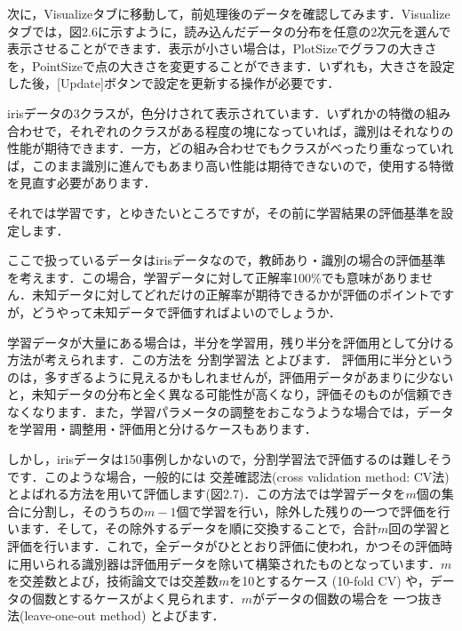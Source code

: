 次に，Visualizeタブに移動して，前処理後のデータを確認してみます．Visualizeタブでは，図2.6に示すように，読み込んだデータの分布を任意の2次元を選んで表示させることができます．表示が小さい場合は，PlotSizeでグラフの大きさを，PointSizeで点の大きさを変更することができます．いずれも，大きさを設定した後，[Update]ボタンで設定を更新する操作が必要です．


irisデータの3クラスが，色分けされて表示されています．いずれかの特徴の組み合わせで，それぞれのクラスがある程度の塊になっていれば，識別はそれなりの性能が期待できます．一方，どの組み合わせでもクラスがべったり重なっていれば，このまま識別に進んでもあまり高い性能は期待できないので，使用する特徴を見直す必要があります．


それでは学習です，とゆきたいところですが，その前に学習結果の評価基準を設定します．

ここで扱っているデータはirisデータなので，教師あり・識別の場合の評価基準を考えます．この場合，学習データに対して正解率100\%でも意味がありません．未知データに対してどれだけの正解率が期待できるかが評価のポイントですが，どうやって未知データで評価すればよいのでしょうか．

学習データが大量にある場合は，半分を学習用，残り半分を評価用として分ける方法が考えられます．この方法を
分割学習法
とよびます．
評価用に半分というのは，多すぎるように見えるかもしれませんが，評価用データがあまりに少ないと，未知データの分布と全く異なる可能性が高くなり，評価そのものが信頼できなくなります．また，学習パラメータの調整をおこなうような場合では，データを学習用・調整用・評価用と分けるケースもあります．

しかし，irisデータは150事例しかないので，分割学習法で評価するのは難しそうです．このような場合，一般的には
交差確認法(cross validation method: CV法)
とよばれる方法を用いて評価します(図2.7)．この方法では学習データを$m$個の集合に分割し，そのうちの$m-1$個で学習を行い，除外した残りの一つで評価を行います．そして，その除外するデータを順に交換することで，合計$m$回の学習と評価を行います．これで，全データがひととおり評価に使われ，かつその評価時に用いられる識別器は評価用データを除いて構築されたものとなっています．$m$を交差数とよび，技術論文では交差数$m$を10とするケース (10-fold CV) や，データの個数とするケースがよく見られます．$m$がデータの個数の場合を
一つ抜き法(leave-one-out method)
とよびます．




